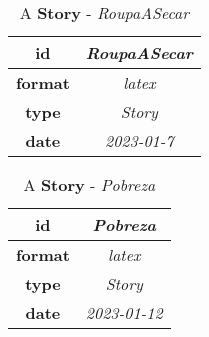 \documentclass{article}
\begin{document}
    \begin{table}[ht!]
        \centering
        \begin{tabular}{|c|c|}
            \hline
            
                \textbf{ id } & \textit{ RoupaASecar } \\
                \hline
            
                \textbf{ format } & \textit{ latex } \\
                \hline
            
                \textbf{ type } & \textit{ Story } \\
                \hline
            
                \textbf{ date } & \textit{ 2023-01-7 } \\
                \hline
            
        \end{tabular}
        \caption{A \textbf{ Story }-\textit{ RoupaASecar }} %
        \label{table:\arabic{tablecounter2}} %
    \end{table}

    \begin{table}[ht!]
        \centering
        \begin{tabular}{|c|c|}
            \hline
            
                \textbf{ id } & \textit{ Pobreza } \\
                \hline
            
                \textbf{ format } & \textit{ latex } \\
                \hline
            
                \textbf{ type } & \textit{ Story } \\
                \hline
            
                \textbf{ date } & \textit{ 2023-01-12 } \\
                \hline
            
        \end{tabular}
        \caption{A \textbf{ Story }-\textit{ Pobreza }} %
        \label{table:\arabic{tablecounter2}} %
    \end{table}
\end{document}
